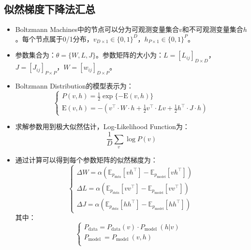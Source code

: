 \documentclass[a4paper]{article}
\begin{document}
\subsection{似然梯度下降法汇总}
\begin{itemize}
    \item Boltzmann Machines中的节点可以分为可观测变量集合$v$和不可观测变量集合$h$。每个节点属于0/1分布，$v_{D\times 1} \in \{0,1\}^D$，$h_{P\times 1} \in \{0,1\}^P$。
    \item 参数集合为：$\theta = \{ W,L,J \}$。参数矩阵的大小为：$L=[L_{ij}]_{D\times D}$，$J=[J_{ij}]_{P\times P}$，$W= [w_{ij}]_{D\times P}$。
    \item Boltzmann Distribution的模型表示为：
    \begin{equation}\left\{\begin{array}{l}
    P(v, h)=\frac{1}{2} \exp \{-\text{E}(v, h)\} \\
    \text{E}(v, h)=-\left(v^{\top} \cdot W \cdot h+\frac{1}{2} v^{\top} \cdot L v+\frac{1}{2} h^{\top} \cdot J \cdot h\right)
    \end{array}\right.\end{equation}
    \item 求解参数用到极大似然估计，Log-Likelihood Function为：
    \begin{equation}
        \frac{1}{D}\sum_v \log P(v)
    \end{equation}
    \item 通过计算可以得到每个参数矩阵的似然梯度为：
    \begin{equation}\left\{\begin{array}{l}
    \Delta W=\alpha \left(\mathbb{E}_{p_{data}}\left[v h^{\top}\right]-\mathbb{E}_{p_{\text{model}}}\left[v h^{\top}\right]\right) \\
    \Delta L=\alpha \left(\mathbb{E}_{p_{data}}\left[v v^{\top}\right]-\mathbb{E}_{p_{\text{model}}}\left[v v^{\top}\right]\right) \\
    \Delta J=\alpha \left(\mathbb{E}_{p_{data}}\left[h h^{\top}\right]-\mathbb{E}_{p_{\text{model}}}\left[h h^{\top}\right]\right)
    \end{array}\right.\end{equation}
    其中：
    \begin{equation}
        \left\{
        \begin{array}{ll}
            P_{\text{data}} =P_{\text{data}} (v) \cdot P_{\text {model }}(h | v) & \\
            P_{\text {model }}=P_{\text {model }}(v, h)  & \\
        \end{array}
        \right.
    \end{equation}
\end{itemize}
\end{document}
